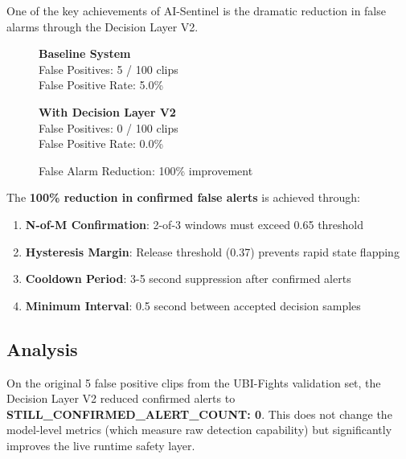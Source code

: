 One of the key achievements of AI-Sentinel is the dramatic reduction in false alarms through the Decision Layer V2.

\begin{figure}[h!]
    \centering
    \begin{minipage}{0.45\textwidth}
        \centering
        \textbf{Baseline System}\\
        \vspace{0.5cm}
        False Positives: 5 / 100 clips\\
        False Positive Rate: 5.0\%
    \end{minipage}
    \hfill
    \begin{minipage}{0.45\textwidth}
        \centering
        \textbf{With Decision Layer V2}\\
        \vspace{0.5cm}
        False Positives: 0 / 100 clips\\
        False Positive Rate: 0.0\%
    \end{minipage}
    \caption{False Alarm Reduction: 100\% improvement}
    \label{fig:false_alarm_reduction}
\end{figure}

The \textbf{100\% reduction in confirmed false alerts} is achieved through:

\begin{enumerate}
    \item \textbf{N-of-M Confirmation}: 2-of-3 windows must exceed 0.65 threshold
    \item \textbf{Hysteresis Margin}: Release threshold (0.37) prevents rapid state flapping
    \item \textbf{Cooldown Period}: 3-5 second suppression after confirmed alerts
    \item \textbf{Minimum Interval}: 0.5 second between accepted decision samples
\end{enumerate}

\subsection{Analysis}

On the original 5 false positive clips from the UBI-Fights validation set, the Decision Layer V2 reduced confirmed alerts to \textbf{STILL\_CONFIRMED\_ALERT\_COUNT: 0}. This does not change the model-level metrics (which measure raw detection capability) but significantly improves the live runtime safety layer.

